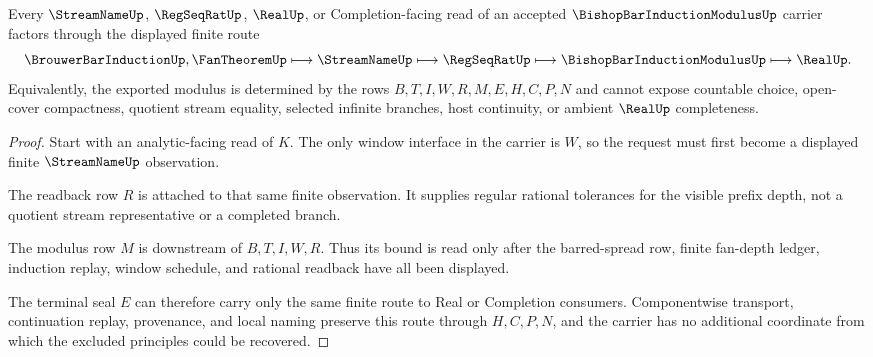 \begin{theorem}
\label{thm:bishop-bar-induction-modulus-window-boundary}
Every $\StreamNameUp$, $\RegSeqRatUp$, $\RealUp$, or Completion-facing read of an accepted $\BishopBarInductionModulusUp$ carrier factors through the displayed finite route
$$
\BrouwerBarInductionUp,\FanTheoremUp \longmapsto \StreamNameUp \longmapsto \RegSeqRatUp \longmapsto \BishopBarInductionModulusUp \longmapsto \RealUp .
$$
Equivalently, the exported modulus is determined by the rows $B,T,I,W,R,M,E,H,C,P,N$ and cannot expose countable choice, open-cover compactness, quotient stream equality, selected infinite branches, host continuity, or ambient $\RealUp$ completeness.
\end{theorem}
\begin{proof}
Start with an analytic-facing read of $K$. The only window interface in the carrier is $W$, so the request must first become a displayed finite $\StreamNameUp$ observation.

The readback row $R$ is attached to that same finite observation. It supplies regular rational tolerances for the visible prefix depth, not a quotient stream representative or a completed branch.

The modulus row $M$ is downstream of $B,T,I,W,R$. Thus its bound is read only after the barred-spread row, finite fan-depth ledger, induction replay, window schedule, and rational readback have all been displayed.

The terminal seal $E$ can therefore carry only the same finite route to Real or Completion consumers. Componentwise transport, continuation replay, provenance, and local naming preserve this route through $H,C,P,N$, and the carrier has no additional coordinate from which the excluded principles could be recovered.
\end{proof}




